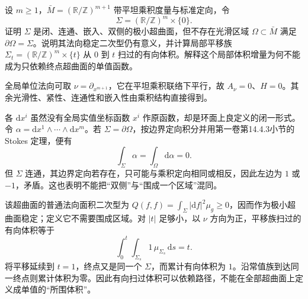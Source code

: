 \begin{optionalexercise}\label{g3:ex:two-sided-nonseparating-torus}
	设 \(m\ge1\)，\(\bar M=(\mathbb R/\mathbb Z)^{m+1}\) 带平坦乘积度量与标准定向，令
	\[
		\Sigma=(\mathbb R/\mathbb Z)^m\times\{0\}.
	\]
	证明 \(\Sigma\) 是闭、连通、嵌入、双侧的极小超曲面，但不存在光滑区域 \(\Omega\subset\bar M\) 满足 \(\partial\Omega=\Sigma\)。说明其法向稳定二次型仍有意义，并计算局部平移族 \(\Sigma_t=(\mathbb R/\mathbb Z)^m\times\{t\}\) 从 \(0\) 到 \(t\) 扫过的有向体积。解释这个局部体积增量为何不能成为只依赖终点超曲面的单值函数。
\end{optionalexercise}
\begin{solution}
	全局单位法向可取 \(\nu=\partial_{x^{m+1}}\)，它在平坦乘积联络下平行，故 \(A_\nu=0\)、\(H=0\)。其余光滑性、紧性、连通性和嵌入性由乘积结构直接得到。

	各 \(\mathrm dx^i\) 虽然没有全局实值坐标函数 \(x^i\) 作原函数，却是环面上良定义的闭一形式。令
	\(\alpha=\mathrm dx^1\wedge\cdots\wedge\mathrm dx^m\)。若 \(\Sigma=\partial\Omega\)，按边界定向积分并用第一卷第14.4.3小节的 Stokes 定理，便有
	\[
		\int_\Sigma\alpha=\int_\Omega\mathrm d\alpha=0.
	\]
	但 \(\Sigma\) 连通，其边界定向若存在，只可能与乘积定向相同或相反，因此左边为 \(1\) 或 \(-1\)，矛盾。这也表明不能把“双侧”与“围成一个区域”混同。

	该超曲面的普通法向面积二次型为
	\(Q(f,f)=\int_\Sigma|\mathrm df|^2\mu_g\ge0\)，因而作为极小超曲面稳定；定义它不需要围成区域。对 \(|t|\) 足够小，以 \(\nu\) 方向为正，平移族扫过的有向体积等于
	\[
		\int_0^t\int_{\Sigma_s}1\,\mu_{\Sigma_s}\,\mathrm ds=t.
	\]
	将平移延续到 \(t=1\)，终点又是同一个 \(\Sigma\)，而累计有向体积为 \(1\)。沿常值族到达同一终点则累计体积为零。因此有向扫过体积可以依赖路径，不能在全部超曲面上定义成单值的“所围体积”。
\end{solution}


